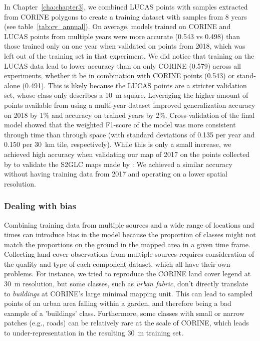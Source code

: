         In Chapter~\ref{cha:chapter3}, we combined LUCAS points with samples extracted from CORINE polygons to create a training dataset with samples from 8 years (see table~\ref{tab:cv_annual}). On average, models trained on CORINE and LUCAS points from multiple years were more accurate (0.543 vs 0.498) than those trained only on one year when validated on points from 2018, which was left out of the training set in that experiment. We did notice that training on the LUCAS data lead to lower accuracy than on only CORINE (0.579) across all experiments, whether it be in combination with CORINE points (0.543) or stand-alone (0.491). This is likely because the LUCAS points are a stricter validation set, whose class only describes a 10~m square. Leveraging the higher amount of points available from using a multi-year dataset improved generalization accuracy on 2018 by 1\% and accuracy on trained years by 2\%. Cross-validation of the final model showed that the weighted F1-score of the model was more consistent through time than through space (with standard deviations of 0.135 per year and 0.150 per 30~km tile, respectively). While this is only a small increase, we achieved high accuracy when validating our map of 2017 on the points collected by \citep{jenerowicz2021validation} to validate the S2GLC maps made by \citet{malinowski2020automated}: We achieved a similar accuracy without having training data from 2017 and operating on a lower spatial resolution.

        \subsubsection{Dealing with bias}
        
        Combining training data from multiple sources and a wide range of locations and times can introduce bias in the model because the proportion of classes might not match the proportions on the ground in the mapped area in a given time frame. Collecting land cover observations from multiple sources requires consideration of the quality and type of each component dataset. which all have their own problems. For instance, we tried to reproduce the CORINE land cover legend at 30~m resolution, but some classes, such as \textit{urban fabric}, don't directly translate to \textit{buildings} at CORINE's large minimal mapping unit. This can lead to sampled points of an urban area falling within a garden, and therefore being a bad example of a 'buildings' class. Furthermore, some classes with small or narrow patches (e.g., roads) can be relatively rare at the scale of CORINE, which leads to under-representation in the resulting 30~m training set. 

